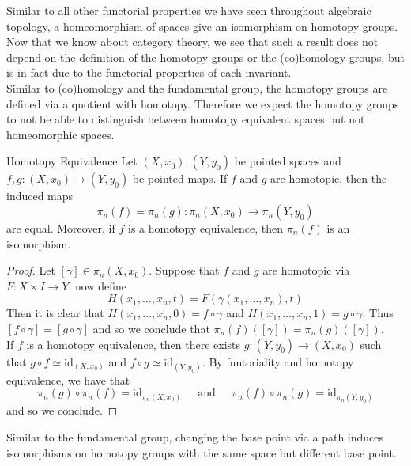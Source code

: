 \documentclass[a4paper]{article}
\begin{document}
Similar to all other functorial properties we have seen throughout algebraic topology, a homeomorphism of spaces give an isomorphism on homotopy groups. Now that we know about category theory, we see that such a result does not depend on the definition of the homotopy groups or the (co)homology groups, but is in fact due to the functorial properties of each invariant. \\

Similar to (co)homology and the fundamental group, the homotopy groups are defined via a quotient with homotopy. Therefore we expect the homotopy groups to not be able to distinguish between homotopy equivalent spaces but not homeomorphic spaces. 

\begin{thm}{Homotopy Equivalence}{} Let $(X,x_0),(Y,y_0)$ be pointed spaces and $f,g:(X,x_0)\to (Y,y_0)$ be pointed maps. If $f$ and $g$ are homotopic, then the induced maps $$\pi_n(f)=\pi_n(g):\pi_n(X,x_0)\to\pi_n(Y,y_0)$$ are equal. Moreover, if $f$ is a homotopy equivalence, then $\pi_n(f)$ is an isomorphism. 
\begin{proof}
Let $[\gamma]\in\pi_n(X,x_0)$. Suppose that $f$ and $g$ are homotopic via $F:X\times I\to Y$. now define $$H(x_1,\dots,x_n,t)=F(\gamma(x_1,\dots,x_n),t)$$ Then it is clear that $H(x_1,\dots,x_n,0)=f\circ\gamma$ and $H(x_1,\dots,x_n,1)=g\circ\gamma$. Thus $[f\circ\gamma]=[g\circ\gamma]$ and so we conclude that $\pi_n(f)([\gamma])=\pi_n(g)([\gamma])$. \\

If $f$ is a homotopy equivalence, then there exists $g:(Y,y_0)\to(X,x_0)$ such that $g\circ f\simeq\text{id}_{(X,x_0)}$ and $f\circ g\simeq\text{id}_{(Y,y_0)}$. By funtoriality and homotopy equivalence, we have that $$\pi_n(g)\circ\pi_n(f)=\text{id}_{\pi_n(X,x_0)}\;\;\;\;\text{ and }\;\;\;\;\pi_n(f)\circ\pi_n(g)=\text{id}_{\pi_n(Y,y_0)}$$ and so we conclude. 
\end{proof}
\end{thm}

Similar to the fundamental group, changing the base point via a path induces isomorphisms on homotopy groups with the same space but different base point. 
\end{document}
